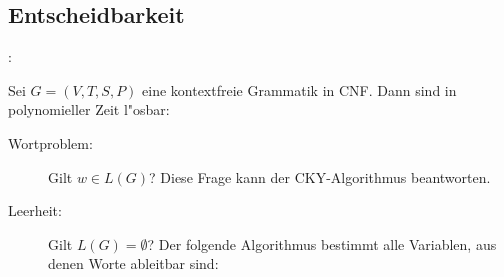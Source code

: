 \subsection{Entscheidbarkeit}
\remark:{
  Sei $G=(V,T,S,P)$ eine kontextfreie Grammatik in CNF. Dann sind in
  polynomieller Zeit l"osbar:
  \begin{description}
    \item[Wortproblem:] Gilt $w \in L(G)$? Diese Frage kann der
      CKY-Algorithmus beantworten.
    \item[Leerheit:] Gilt $L(G) = \emptyset$? Der folgende Algorithmus
      bestimmt alle Variablen, aus denen Worte ableitbar sind:
\end{description}}
